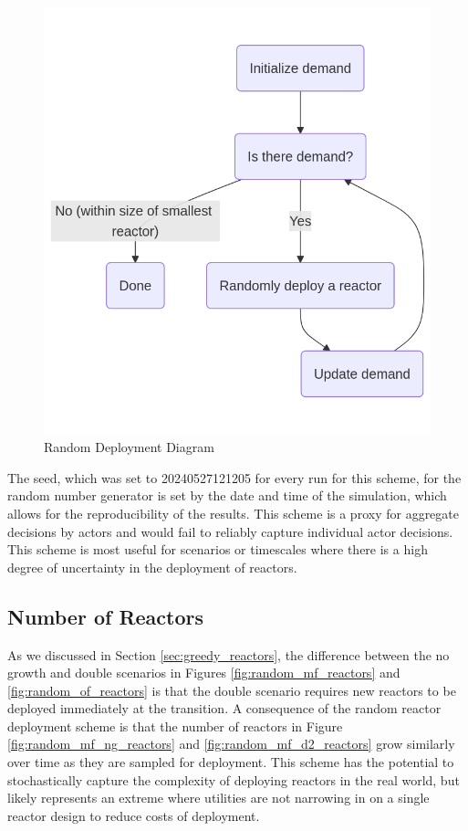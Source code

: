 \begin{figure}[H]
    \centering
    \includegraphics[scale=0.3]{images/schemes/random_diagram.png}
    \caption{Random Deployment Diagram}
    \label{fig:random_diagram}
\end{figure}

The seed, which was set to 20240527121205 for every run for this scheme, for
the random number generator is set by the date and time of the simulation,
which allows for the reproducibility of the results. This scheme is a proxy for
aggregate decisions by actors and would fail to reliably capture individual
actor decisions. This scheme is most useful for scenarios or timescales where
there is a high degree of uncertainty in the deployment of reactors.


\subsection{Number of Reactors}
\label{sec:random_reactors}

As we discussed in Section \ref{sec:greedy_reactors}, the difference between the no growth and double scenarios in Figures \ref{fig:random_mf_reactors} and \ref{fig:random_of_reactors} is that the double scenario requires new reactors to be deployed immediately at the transition. A consequence of the random reactor deployment scheme is that the number of reactors in Figure \ref{fig:random_mf_ng_reactors} and \ref{fig:random_mf_d2_reactors} grow similarly over time as they are sampled for deployment. This scheme has the potential to stochastically capture the complexity of deploying reactors in the real world, but likely represents an extreme where utilities are not narrowing in on a single reactor design to reduce costs of deployment.

